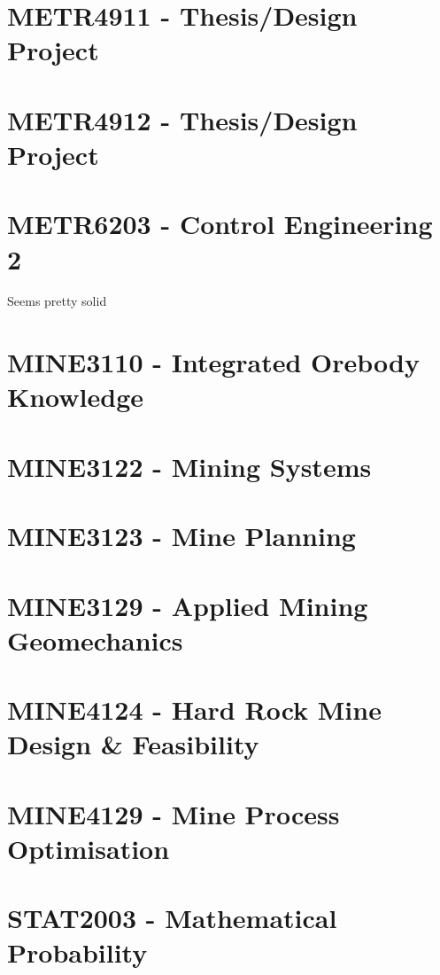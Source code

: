 \documentclass[a4paper,12pt]{report}
\begin{document}
\hypertarget{METR4911}{\section{METR4911 - Thesis/Design Project}}

\hypertarget{METR4912}{\section{METR4912 - Thesis/Design Project}}

\hypertarget{METR6203}{\section{METR6203 - Control Engineering 2}}
Seems pretty solid

\hypertarget{MINE3110}{\section{MINE3110 - Integrated Orebody Knowledge}}

\hypertarget{MINE3122}{\section{MINE3122 - Mining Systems}}

\hypertarget{MINE3123}{\section{MINE3123 - Mine Planning}}

\hypertarget{MINE3129}{\section{MINE3129 - Applied Mining Geomechanics}}

\hypertarget{MINE4124}{\section{MINE4124 - Hard Rock Mine Design \& Feasibility}}

\hypertarget{MINE4129}{\section{MINE4129 - Mine Process Optimisation}}

\hypertarget{STAT2003}{\section{STAT2003 - Mathematical Probability}}
\end{document}
